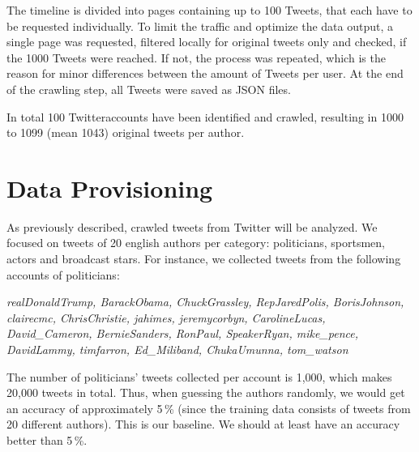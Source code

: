 \documentclass[journal, a4paper, 12pt]{IEEEtran}
\begin{document}
The timeline is divided into pages containing up to 100 Tweets, that each have to be requested individually. To limit the traffic and optimize the data output, a single page was requested, filtered locally for original tweets only and checked, if the 1000 Tweets were reached. If not, the process was repeated, which is the reason for minor differences between the amount of Tweets per user. At the end of the crawling step, all Tweets were saved as JSON files. 

In total 100 Twitteraccounts have been identified and crawled, resulting in 1000 to 1099 (mean 1043) original tweets per author.  

\section{Data Provisioning}
\label{sec:provisioning}
\vspace{-2mm}
As previously described, crawled tweets from Twitter will be analyzed. We focused on tweets of 20 english authors per category: politicians, sportsmen, actors and broadcast stars. For instance, we collected tweets from the following accounts of politicians:

\footnotesize
\textit{
realDonaldTrump, BarackObama, ChuckGrassley, RepJaredPolis, BorisJohnson, clairecmc, ChrisChristie, jahimes, jeremycorbyn, CarolineLucas, David\_Cameron, BernieSanders, RonPaul, SpeakerRyan, mike\_pence, DavidLammy, timfarron, Ed\_Miliband, ChukaUmunna, tom\_watson
}
\normalsize

The number of politicians' tweets collected per account is 1,000, which makes 20,000 tweets in total. Thus, when guessing the authors randomly, we would get an accuracy of approximately 5\,\% (since the training data consists of tweets from 20 different authors). This is our baseline. We should at least have an accuracy better than 5\,\%.
\end{document}
